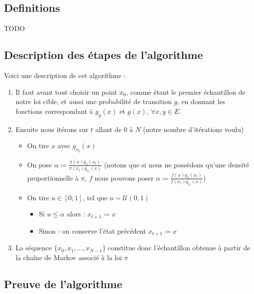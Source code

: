 \documentclass{article}
\begin{document}
\subsection{Definitions}

TODO \\

\subsection{Description des étapes de l'algorithme}

Voici une description de cet algorithme :

\begin{enumerate}
\item Il faut avant tout choisir un point $x_0$, comme étant le premier échantillon de notre loi cible, et aussi une probabilité de transition $g$, en donnant les fonctions correspondant à $g_y(x)$ et $g(x)$, $\forall x,y \in E$.  

\item Ensuite nous itérons sur $t$ allant de 0 à $N$ (notre nombre d'itérations voulu)  \begin{itemize}
    \item On tire $x$ avec $g_{x_t}(x)$  
    \item On pose $\alpha \coloneqq \frac{ \pi(x) g_x(x_t)}{\pi(x_t) g_{x_t}(x)}$ (notons que si nous ne possédons qu'une densité proportionnelle à $\pi$, $f$ nous pouvons poser $\alpha \coloneqq \frac{ f(x) g_x(x_t)}{f(x_t) g_{x_t}(x)}$)  
    \item On tire $u \in [0;1]$, tel que $u  \sim \mathcal{U}(0,1)$  \begin{itemize}
        \item Si $u \leqslant \alpha$ alors : $x_{t+1} \coloneqq x$  
        \item Sinon : on conserve l'état précédent $x_{t+1} \coloneqq x$  
        \end{itemize}
    \end{itemize}
\item La séquence $\{x_0,x_1, ... ,x_{N-1}\}$ constitue donc l'échantillon obtenue à partir de la chaîne de Markov associé à la loi $\pi$
\end{enumerate}

\subsection{Preuve de l'algorithme}
\end{document}
